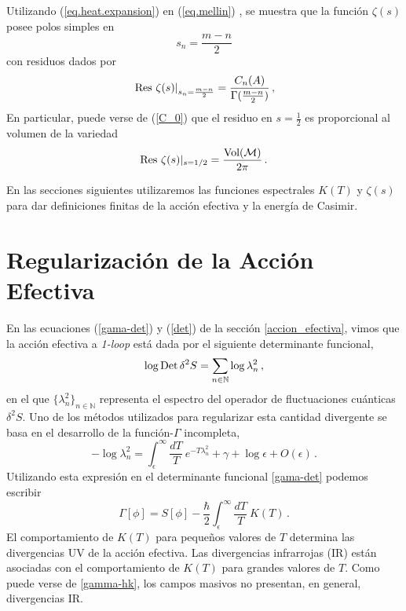 Utilizando (\ref{eq.heat.expansion}) en  (\ref{eq.mellin}) , se muestra que la función $\zeta (s)$ posee polos simples en
\begin{equation}
s _n = \frac{m-n}{2} 
\label{eq.ceros.zeta}
\end{equation}
con residuos dados por
\begin{equation}
\left. {\rm Res} \ \zeta  (s)  \right| _{s_n= \frac{m - n}{2}} =  
\frac{ C_n  (A) }{ {\Gamma ( \frac{m-n}{2}} ) }
	\, ,
\label{losresi}
\end{equation}
En particular, puede verse de (\ref{C_0}) que el residuo en $s=\frac{1}{2}$ es proporcional al volumen de la variedad
\begin{equation}\label{eq.vol}
	{\rm Res} \ \zeta (s) | _{s=1/2} = \frac{ {\rm Vol (\mathcal{M})} }{2 \pi} \, .
\end{equation}


En las secciones siguientes utilizaremos las funciones espectrales $K(T)$ y $\zeta(s) $ para dar definiciones finitas de la acción efectiva y la energía de Casimir.

\section{Regularización de la Acción Efectiva}\label{cap.acc}

En las ecuaciones (\ref{gama-det}) y (\ref{det}) de la sección \ref{accion_efectiva}, vimos que la acción efectiva a {\it 1-loop} está dada por el siguiente determinante funcional,
\begin{equation}
    \log {\rm Det} \, \delta ^2 S = 
    \sum_{n\in{\mathbb N}} \log \lambda ^2 _n
    \, ,
\end{equation}
en el que $\{\lambda ^2 _n\}_{n\in\mathbb N}$ representa el espectro del operador de fluctuaciones cuánticas $\delta^2S$. Uno de los métodos utilizados para regularizar esta cantidad divergente se basa en el desarrollo de la función-$\Gamma$ incompleta,
\begin{equation}
- \log\lambda ^2 _n=\int _ { \epsilon } ^{\infty}\frac{dT}{T}\ e ^{- T \lambda ^2 _n} +\gamma+\log\epsilon + O ( \epsilon  ) \,.
\end{equation}
Utilizando esta expresión en el determinante funcional  \eqref{gama-det} podemos escribir
\begin{equation}\label{gamma-hk}
\Gamma [ \phi ] = 
S[ \phi ] - 
\frac{\hbar }{2}
\int _ { \epsilon } ^{\infty} \frac{ dT}{T}\ K(T) \, .
\end{equation}
El comportamiento de $K(T)$ para pequeños valores de $T$ determina las divergencias UV de la acción efectiva. Las divergencias infrarrojas (IR) están asociadas con el comportamiento de $K(T)$ para grandes valores de $T$. Como puede verse de \eqref{gamma-hk}, los campos masivos no presentan, en general, divergencias IR.

